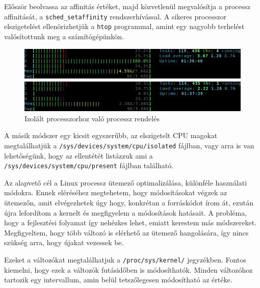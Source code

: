 Először beolvassa az affinitás értéket, majd közvetlenül megvalósítja a processz affinitását, a \texttt{sched\_setaffinity} rendszerhívással.
A sikeres processzor elszigetelést ellenörizhetjük a \texttt{htop} programmal, amint egy nagyobb terhelést valósítottunk meg a számítógépünkön.

\begin{figure}[h!]
\centering
\includegraphics[width=\textwidth]{images/tasksetHtop.png}
\caption{Izolált processzorhoz való processz rendelés}
\label{fig:taskset}
\end{figure}

A másik módszer egy kicsit egyszerűbb, az elszigetelt CPU magokat megtalálhatjük a \texttt{/sys/devices/system/cpu/isolated} fájlban, vagy arra is van lehetőségünk, hogy az ellentétét listázzuk ami a \texttt{/sys/devices/system/cpu/present} fájlban található.


Az alapvető cél a Linux processz ütemező optimalizálása, különféle használati módokra.
Ennek eléréséhez megtehetem, hogy módosításokat végzek az ütemezőn, amit elvégezhetek úgy hogy, konkrétan a forráskódot írom át, ezután újra lefordítom a kernelt és megfigyelem a módosítások hatásait.
A probléma, hogy a fejlesztési folyamat így nehézkes lehet, emiatt kerestem más módszereket.
Megfigyeltem, hogy több változó is elérhető az ütemező hangolására, így nincs szükség arra, hogy újakat vezessek be.

Ezeket a változókat megtalálhatjuk a \texttt{/proc/sys/kernel/} jegyzékben. Fontos kiemelni, hogy ezek a változók futásidőben is módosíthatók. Minden változóhoz tartozik egy intervallum, amin belül tetszőlegesen módosítható az értéke. 

